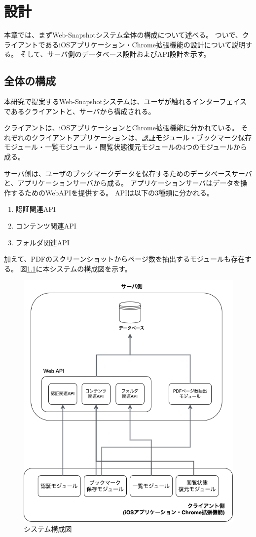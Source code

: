 \chapter{設計}
\label{chap:design}
本章では、まずWeb-Snapshotシステム全体の構成について述べる。
ついで、クライアントであるiOSアプリケーション・Chrome拡張機能の設計について説明する。
そして、サーバ側のデータベース設計およびAPI設計を示す。

\section{全体の構成}
本研究で提案するWeb-Snapshotシステムは、ユーザが触れるインターフェイスであるクライアントと、サーバから構成される。

クライアントは、iOSアプリケーションとChrome拡張機能に分かれている。
それぞれのクライアントアプリケーションは、認証モジュール・ブックマーク保存モジュール・一覧モジュール・閲覧状態復元モジュールの4つのモジュールから成る。

サーバ側は、ユーザのブックマークデータを保存するためのデータベースサーバと、アプリケーションサーバから成る。
アプリケーションサーバはデータを操作するためのWebAPIを提供する。
APIは以下の3種類に分かれる。

\begin{enumerate}
   \item 認証関連API
   \item コンテンツ関連API
   \item フォルダ関連API
\end{enumerate}

加えて、PDFのスクリーンショットからページ数を抽出するモジュールも存在する。
図\ref{fig:design-system-overall}に本システムの構成図を示す。

\begin{figure}[htbp]
  \caption{システム構成図}
  \label{fig:design-system-overall}
  \begin{center}
    \includegraphics[bb=0 0 592 681,width=15cm]{img/040_design/design-system-overall.pdf}
  \end{center}
\end{figure}


